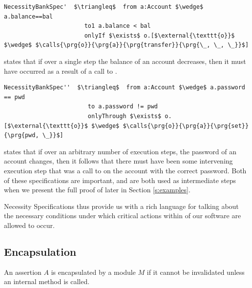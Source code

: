 \begin{lstlisting}[language = Chainmail, mathescape=true, frame=lines]
NecessityBankSpec'  $\triangleq$  from a:Account $\wedge$ a.balance==bal
                       to1 a.balance < bal
                       onlyIf $\exists$ o.[$\external{\texttt{o}}$ $\wedge$ $\calls{\prg{o}}{\prg{a}}{\prg{transfer}}{\prg{\_, \_, \_}}$]
\end{lstlisting}
 
 states that if over a single step the balance of an account decreases, then it must have occurred as 
a result of a call to .
 
\begin{lstlisting}[language = Chainmail, mathescape=true, frame=lines]
NecessityBankSpec''  $\triangleq$  from a:Account $\wedge$ a.password == pwd
                        to a.password != pwd
                        onlyThrough $\exists$ o.[$\external{\texttt{o}}$ $\wedge$ $\calls{\prg{o}}{\prg{a}}{\prg{set}}{\prg{pwd, \_}}$]
\end{lstlisting}
 
 states that if over an arbitrary number of execution steps, the password of an account changes,
then it follows that there must have been some intervening execution step that was a call to  on the account 
with the correct password. Both of these specifications are important, and are both used as intermediate steps
when we present the full proof of  later in Section \ref{s:examples}.

Necessity Specifications thus provide us with a rich language for talking about the necessary conditions
under which critical actions within of our software are allowed to occur.
 




\subsection{Encapsulation}
\jm[lemmas? does A => enc(A') imply A => enc($\neg$A')?]{}
An assertion $A$ is encapsulated by a module $M$ if it cannot be invalidated unless an
internal method is called. 

